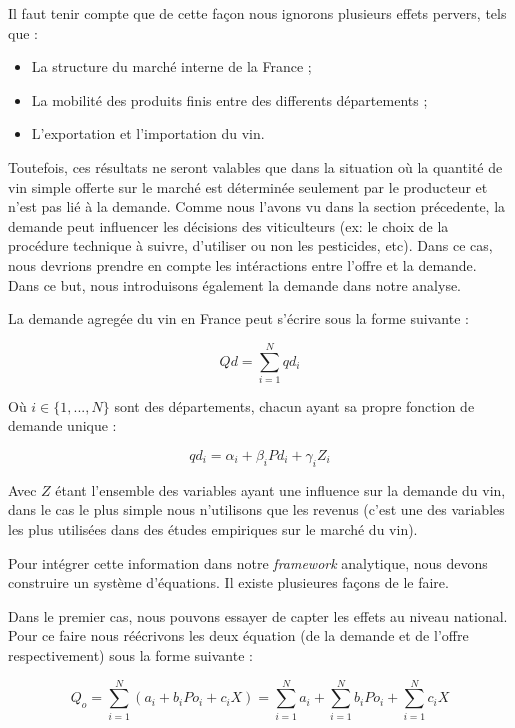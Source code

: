 \documentclass[11pt,]{article}
\providecommand{\tightlist}{%
  \setlength{\itemsep}{0pt}\setlength{\parskip}{0pt}}
\begin{document}
Il faut tenir compte que de cette façon nous ignorons plusieurs effets
pervers, tels que :

\begin{itemize}
\tightlist
\item
  La structure du marché interne de la France ;
\item
  La mobilité des produits finis entre des differents départements ;
\item
  L'exportation et l'importation du vin.
\end{itemize}

Toutefois, ces résultats ne seront valables que dans la situation où la
quantité de vin simple offerte sur le marché est déterminée seulement
par le producteur et n'est pas lié à la demande. Comme nous l'avons vu
dans la section précedente, la demande peut influencer les décisions des
viticulteurs (ex: le choix de la procédure technique à suivre,
d'utiliser ou non les pesticides, etc). Dans ce cas, nous devrions
prendre en compte les intéractions entre l'offre et la demande. Dans ce
but, nous introduisons également la demande dans notre analyse.

La demande agregée du vin en France peut s'écrire sous la forme suivante
:

\begin{equation*}
    Qd = \sum_{i = 1}^{N} qd_i 
\end{equation*}

Où \(i \in \{1, ..., N\}\) sont des départements, chacun ayant sa propre
fonction de demande unique :

\begin{equation*}
    qd_i = \alpha_i + \beta_i Pd_i + \gamma_i Z_i 
\end{equation*}

Avec \(Z\) étant l'ensemble des variables ayant une influence sur la
demande du vin, dans le cas le plus simple nous n'utilisons que les
revenus (c'est une des variables les plus utilisées dans des études
empiriques sur le marché du vin).

Pour intégrer cette information dans notre \emph{framework} analytique,
nous devons construire un système d'équations. Il existe plusieures
façons de le faire.

Dans le premier cas, nous pouvons essayer de capter les effets au niveau
national. Pour ce faire nous réécrivons les deux équation (de la demande
et de l'offre respectivement) sous la forme suivante :

\begin{equation*}
    Q_o = \sum_{i = 1}^{N} (a_i + b_i Po_i + c_i X) = \sum_{i = 1}^{N} a_i + \sum_{i = 1}^{N} b_i Po_i + \sum_{i = 1}^{N} c_i X
\end{equation*}
\end{document}
